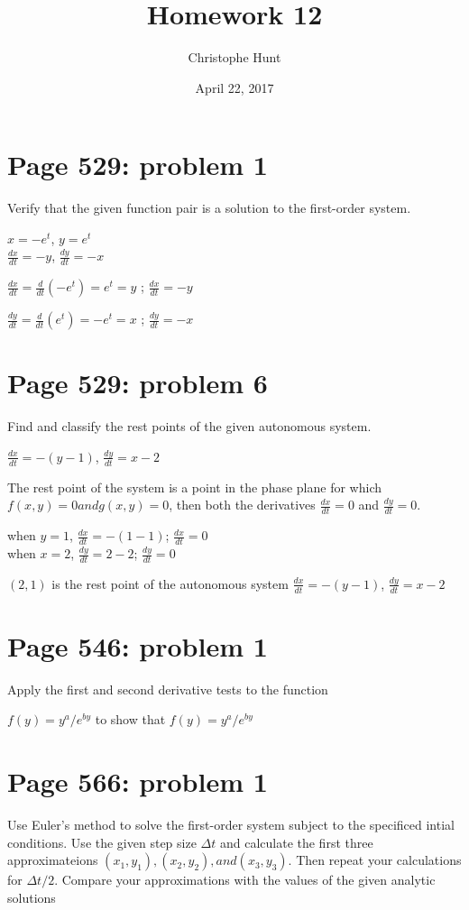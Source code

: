 \documentclass[]{article}
\title{Homework 12}
\author{Christophe Hunt}
\date{April 22, 2017}
\begin{document}
\maketitle

{
\setcounter{tocdepth}{2}
\tableofcontents
}
\newpage

\section{Page 529: problem 1}\label{page-529-problem-1}

Verify that the given function pair is a solution to the first-order
system.

\(x = -e^t\), \(y = e^t\)\\
\(\frac{dx}{dt} = -y\), \(\frac{dy}{dt} = -x\)

\(\frac{dx}{dt} = \frac{d}{dt}(-e^t) = e^t = y\) ;
\(\frac{dx}{dt} = -y\)

\(\frac{dy}{dt} = \frac{d}{dt}(e^t) = -e^t = x\) ;
\(\frac{dy}{dt} = -x\)

\newpage

\section{Page 529: problem 6}\label{page-529-problem-6}

Find and classify the rest points of the given autonomous system.

\(\frac{dx}{dt} = -(y-1)\), \(\frac{dy}{dt} = x-2\)

The rest point of the system is a point in the phase plane for which
\(f(x,y) = 0 and g(x,y) = 0\), then both the derivatives
\(\frac{dx}{dt} = 0\) and \(\frac{dy}{dt}= 0\).

when \(y = 1\), \(\frac{dx}{dt} = -(1-1)\); \(\frac{dx}{dt}= 0\)\\
when \(x = 2\), \(\frac{dy}{dt} = 2 - 2\); \(\frac{dy}{dt} = 0\)

\((2,1)\) is the rest point of the autonomous system
\(\frac{dx}{dt} = -(y-1)\), \(\frac{dy}{dt} = x-2\)

\section{Page 546: problem 1}\label{page-546-problem-1}

Apply the first and second derivative tests to the function

\(f(y) = y^a/e^{by}\) to show that \(f(y) = y^a/e^{by}\)

\section{Page 566: problem 1}\label{page-566-problem-1}

Use Euler's method to solve the first-order system subject to the
specificed intial conditions. Use the given step size \(\Delta{t}\) and
calculate the first three approximateions
\((x_1, y_1), (x_2, y_2), and (x_3, y_3)\). Then repeat your
calculations for \(\Delta t/2\). Compare your approximations with the
values of the given analytic solutions
\end{document}
